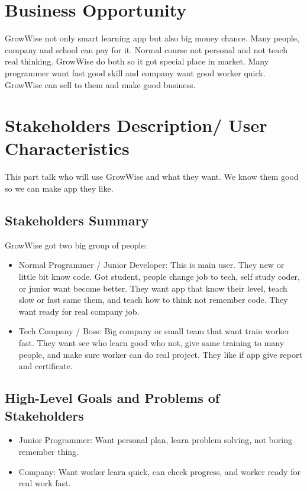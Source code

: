 \documentclass{FastFyp}
\begin{document}
\section{Business Opportunity}
GrowWise not only smart learning app but also big money chance. Many people, company and school can pay for it. Normal course not personal and not teach real thinking. GrowWise do both so it got special place in market. Many programmer want fast good skill and company want good worker quick. GrowWise can sell to them and make good business.

\section{Stakeholders Description/ User Characteristics}

This part talk who will use GrowWise and what they want. We know them good so we can make app they like.

\subsection{Stakeholders Summary}

GrowWise got two big group of people:

\begin{itemize}
    \item Normal Programmer / Junior Developer: This is main user. They new or little bit know code. Got student, people change job to tech, self study coder, or junior want become better. They want app that know their level, teach slow or fast same them, and teach how to think not remember code. They want ready for real company job.

    \item Tech Company / Boss: Big company or small team that want train worker fast. They want see who learn good who not, give same training to many people, and make sure worker can do real project. They like if app give report and certificate.
\end{itemize}

\subsection{High-Level Goals and Problems of Stakeholders}

\begin{itemize}
    \item Junior Programmer: Want personal plan, learn problem solving, not boring remember thing.

    \item Company: Want worker learn quick, can check progress, and worker ready for real work fast.
\end{itemize}
\end{document}
